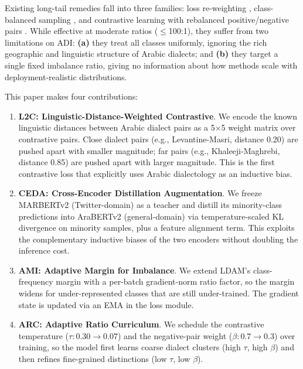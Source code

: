 \documentclass[11pt,a4paper,twocolumn]{article}
\newcommand{\method}{L2C}
\newcommand{\ceda}{CEDA}
\newcommand{\ami}{AMI}
\newcommand{\arc}{ARC}
\begin{document}
Existing long-tail remedies fall into three families: loss re-weighting
\citep{Lin2017,Cui2019,Cao2019ldam,Menon2021}, class-balanced sampling
\citep{Kang2020decoupling}, and contrastive learning with rebalanced
positive/negative pairs \citep{Khosla2020,Cao2021}. While effective at
moderate ratios ($\le$100:1), they suffer from two limitations on ADI:
\textbf{(a)} they treat all classes uniformly, ignoring the rich
geographic and linguistic structure of Arabic dialects; and
\textbf{(b)} they target a single fixed imbalance ratio, giving no
information about how methods scale with deployment-realistic distributions.

This paper makes four contributions:

\begin{enumerate}\itemsep0pt
\item \textbf{\method{}: Linguistic-Distance-Weighted Contrastive}.
We encode the known linguistic distances between Arabic dialect pairs
as a 5$\times$5 weight matrix over contrastive pairs. Close dialect
pairs (e.g., Levantine-Masri, distance 0.20) are pushed apart with
smaller magnitude; far pairs (e.g., Khaleeji-Maghrebi, distance 0.85)
are pushed apart with larger magnitude. This is the first contrastive
loss that explicitly uses Arabic dialectology as an inductive bias.

\item \textbf{\ceda{}: Cross-Encoder Distillation Augmentation}.
We freeze MARBERTv2 (Twitter-domain) as a teacher and distill its
minority-class predictions into AraBERTv2 (general-domain) via
temperature-scaled KL divergence on minority samples, plus a feature
alignment term. This exploits the complementary inductive biases of
the two encoders without doubling the inference cost.

\item \textbf{\ami{}: Adaptive Margin for Imbalance}.
We extend LDAM's class-frequency margin with a per-batch gradient-norm
ratio factor, so the margin widens for under-represented classes that
are still under-trained. The gradient state is updated via an EMA in
the loss module.

\item \textbf{\arc{}: Adaptive Ratio Curriculum}.
We schedule the contrastive temperature ($\tau: 0.30\!\to\!0.07$) and
the negative-pair weight ($\beta: 0.7\!\to\!0.3$) over training, so the
model first learns coarse dialect clusters (high $\tau$, high $\beta$)
and then refines fine-grained distinctions (low $\tau$, low $\beta$).
\end{enumerate}
\end{document}
